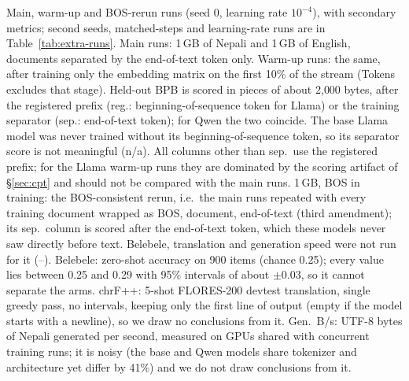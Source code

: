 \begin{table}[t]
\caption{Main, warm-up and BOS-rerun runs (seed 0, learning rate $10^{-4}$), with secondary metrics; second seeds, matched-steps and learning-rate runs are in Table~\ref{tab:extra-runs}. Main runs: 1\,GB of Nepali and 1\,GB of English, documents separated by the end-of-text token only. Warm-up runs: the same, after training only the embedding matrix on the first 10\% of the stream (Tokens excludes that stage). Held-out BPB is scored in pieces of about 2{,}000 bytes, after the registered prefix (reg.: beginning-of-sequence token for Llama) or the training separator (sep.: end-of-text token); for Qwen the two coincide. The base Llama model was never trained without its beginning-of-sequence token, so its separator score is not meaningful (n/a). All columns other than sep.\ use the registered prefix; for the Llama warm-up runs they are dominated by the scoring artifact of \S\ref{sec:cpt} and should not be compared with the main runs. 1\,GB, BOS in training: the BOS-consistent rerun, i.e.\ the main runs repeated with every training document wrapped as BOS, document, end-of-text (third amendment); its sep.\ column is scored after the end-of-text token, which these models never saw directly before text. Belebele, translation and generation speed were not run for it (--). Belebele: zero-shot accuracy on 900 items (chance 0.25); every value lies between 0.25 and 0.29 with 95\% intervals of about $\pm$0.03, so it cannot separate the arms. chrF++: 5-shot FLORES-200 devtest translation, single greedy pass, no intervals, keeping only the first line of output (empty if the model starts with a newline), so we draw no conclusions from it. Gen.\ B/s: UTF-8 bytes of Nepali generated per second, measured on GPUs shared with concurrent training runs; it is noisy (the base and \RO{} Qwen models share tokenizer and architecture yet differ by 41\%) and we do not draw conclusions from it.}
\label{tab:cpt}
\end{table}
